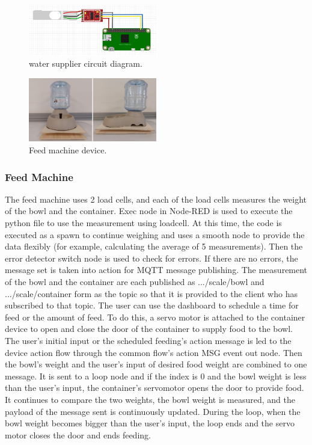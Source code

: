 \documentclass[conference]{IEEEtran}
\begin{document}
\begin{figure}[htbp]
\centerline{\includegraphics[width=0.5\textwidth]{./images/water supplier circuit.jpg}}
\caption{water supplier circuit diagram.}
\label{fig}
\end{figure}

\begin{figure}[htbp]
\centerline{\includegraphics[width=0.5\textwidth]{./images/Feed Machine.jpg}}
\caption{Feed machine device.}
\label{fig}
\end{figure}

\subsubsection{Feed Machine}
The feed machine uses 2 load cells, and each of the load cells measures the weight of the bowl
and the container. Exec node in Node-RED is used to execute the python file to use the
measurement using loadcell. At this time, the code is executed as a spawn to continue weighing
and uses a smooth node to provide the data flexibly (for example, calculating the average of 5
measurements). Then the error detector switch node is used to check for errors. If there are no
errors, the message set is taken into action for MQTT message publishing. The measurement of
the bowl and the container are each published as .../scale/bowl and .../scale/container form as the
topic so that it is provided to the client who has subscribed to that topic.
The user can use the dashboard to schedule a time for feed or the amount of feed. To do this, a
servo motor is attached to the container device to open and close the door of the container to
supply food to the bowl. The user’s initial input or the scheduled feeding’s action message is led
to the device action flow through the common flow’s action MSG event out node. Then the
bowl’s weight and the user’s input of desired food weight are combined to one message. It is sent
to a loop node and if the index is 0 and the bowl weight is less than the user’s input, the
container’s servomotor opens the door to provide food. It continues to compare the two weights,
the bowl weight is measured, and the payload of the message sent is continuously updated.
During the loop, when the bowl weight becomes bigger than the user’s input, the loop ends and
the servo motor closes the door and ends feeding.
\end{document}
